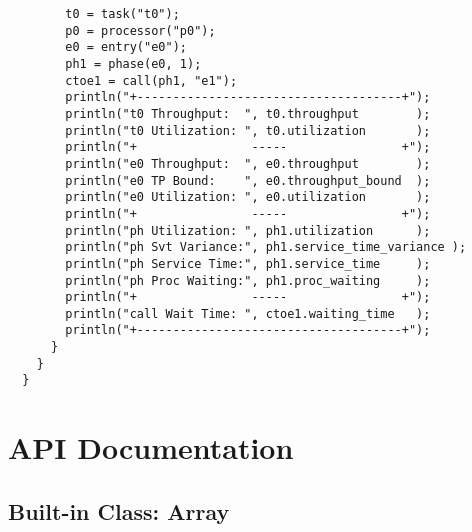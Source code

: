       \lstset{ firstnumber=13}
      \begin{lstlisting}
        t0 = task("t0");
        p0 = processor("p0");
        e0 = entry("e0");
        ph1 = phase(e0, 1);
        ctoe1 = call(ph1, "e1");
        println("+-------------------------------------+");
        println("t0 Throughput:  ", t0.throughput        );
        println("t0 Utilization: ", t0.utilization       );
        println("+                -----                +");
        println("e0 Throughput:  ", e0.throughput        );
        println("e0 TP Bound:    ", e0.throughput_bound  );
        println("e0 Utilization: ", e0.utilization       );
        println("+                -----                +");
        println("ph Utilization: ", ph1.utilization      );
        println("ph Svt Variance:", ph1.service_time_variance );
        println("ph Service Time:", ph1.service_time     );
        println("ph Proc Waiting:", ph1.proc_waiting     );
        println("+                -----                +");
        println("call Wait Time: ", ctoe1.waiting_time   );
        println("+-------------------------------------+");
      }
    }
  }
\end{lstlisting}


\section{API Documentation}
\label{sec:api}
\subsection{Built-in Class: Array}

